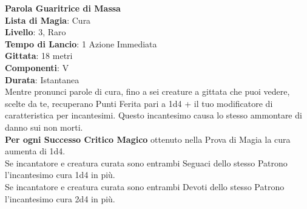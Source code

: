 \documentclass[a4paper,twoside,openany]{book}
\begin{document}
\begin{multicols}{2}
\medskip\textbf{Parola Guaritrice di Massa}\\
\textbf{Lista di Magia}: Cura\\
\textbf{Livello}: 3, Raro\\
\textbf{Tempo di Lancio}: 1 Azione Immediata\\
\textbf{Gittata}: 18 metri\\
\textbf{Componenti}: V\\
\textbf{Durata}: Istantanea\\
Mentre pronunci parole di cura, fino a sei creature a gittata che puoi vedere, scelte da te, recuperano Punti Ferita pari a 1d4 + il tuo modificatore di caratteristica per incantesimi. Questo incantesimo causa lo stesso ammontare di danno sui non morti.\\
\textbf{Per ogni Successo Critico Magico} ottenuto nella Prova di Magia la cura aumenta di 1d4.\\
Se incantatore e creatura curata sono entrambi Seguaci dello stesso Patrono l'incantesimo cura 1d4 in più.\\
Se incantatore e creatura curata sono entrambi Devoti dello stesso Patrono l'incantesimo cura 2d4 in più.


\end{multicols}
\end{document}
